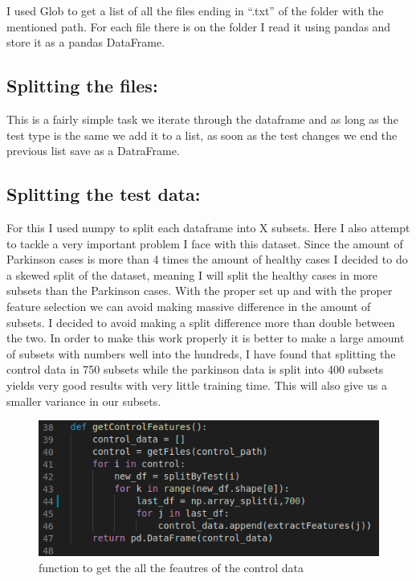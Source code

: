 \documentclass{article} %
\begin{document}
I used Glob to get a list of all the files ending in “.txt” of the folder with the mentioned path. For each file there is on the folder I read it using pandas and store it as a pandas DataFrame.
\bigskip
\bigskip
\subsection*{Splitting the files:}

This is a fairly simple task we iterate through the dataframe and as long as the test type is the same we add it to a list, as soon as the test changes we end the previous list save as a DatraFrame.
\bigskip
\bigskip
\subsection*{Splitting the test data:}

For this I used numpy to split each dataframe into X subsets. Here I also attempt to tackle a very important problem I face with this dataset. Since the amount of Parkinson cases is more than 4 times the amount of healthy cases I decided to do a skewed split of the dataset, meaning I will split the healthy cases in more subsets than the Parkinson cases. With the proper set up and with the proper feature selection we can avoid making massive difference in the amount of subsets. I decided to avoid making a split difference more than double between the two. In order to make this work properly it is better to make a large amount of subsets with numbers well into the hundreds, I have found that splitting the control data in 750 subsets while the parkinson data is split into 400 subsets yields very good results with very little training time. This will also give us a smaller variance in our subsets.

\begin{figure}[h!]
  \includegraphics[scale = 1]{control.png}
  \centering
  \caption{function to get the all the feautres of the control data}\hspace*{\fill}
  \label{fig:a}
\end{figure}
\end{document}
